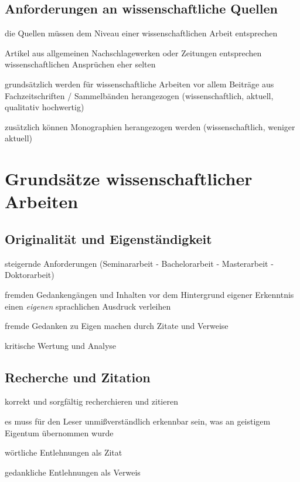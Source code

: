 \documentclass[a4paper,oneside,DIV8,10pt]{scrartcl}
\begin{document}
    \subsection{Anforderungen an wissenschaftliche Quellen}
    \begin{compactitem}
        \item die Quellen müssen dem Niveau einer wissenschaftlichen Arbeit entsprechen
        \item Artikel aus allgemeinen Nachschlagewerken oder Zeitungen 
        entsprechen wissenschaftlichen Ansprüchen eher selten
        \item grundsätzlich werden für wissenschaftliche Arbeiten vor allem
        Beiträge aus Fachzeitschriften / Sammelbänden herangezogen 
        (wissenschaftlich, aktuell, qualitativ hochwertig)
        \item zusätzlich können Monographien herangezogen werden 
        (wissenschaftlich, weniger aktuell)
    \end{compactitem}
    
\section{Grundsätze wissenschaftlicher Arbeiten}

    \subsection{Originalität und Eigenständigkeit}
    \begin{compactitem}
        \item steigernde Anforderungen (Seminararbeit - Bachelorarbeit - Masterarbeit - Doktorarbeit)
        \item fremden Gedankengängen und Inhalten vor dem Hintergrund 
        eigener Erkenntnis einen \textit{eigenen} sprachlichen Ausdruck verleihen
        \item fremde Gedanken zu Eigen machen durch Zitate und Verweise
        \item kritische Wertung und Analyse
    \end{compactitem}

    \subsection{Recherche und Zitation}
    \begin{compactitem}
        \item korrekt und sorgfältig recherchieren und zitieren
        \item es muss für den Leser unmißverständlich erkennbar sein, 
        was an geistigem Eigentum übernommen wurde
        \item wörtliche Entlehnungen als Zitat
        \item gedankliche Entlehnungen als Verweis
    \end{compactitem}
\end{document}
